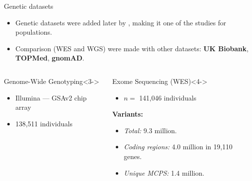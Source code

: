 \begin{frame}{Genetic datasets}

    \begin{itemize}
        \item Genetic datasets were added later by \textcite{ziyatdinov2023}, making it one of the  studies for  populations.
        \item<2-> Comparison (WES and WGS) were made with other datasets: \textbf{UK Biobank}, \textbf{TOPMed}, \textbf{gnomAD}.
    \end{itemize}

    {\footnotesize
    \begin{columns}[t]

        \begin{column}{0.3\textwidth}
            \begin{block}{Genome-Wide Genotyping}<3->
                \begin{itemize}
                    \item Illumina --- GSAv2 chip array
                    \item 138,511 individuals
                \end{itemize}
            \end{block}
        \end{column}

        \begin{column}{0.3\textwidth}
            \begin{block}{Exome Sequencing (WES)}<4->
                \begin{itemize}
                    \item $n =$ 141,046 individuals
                \end{itemize}

                \textbf{Variants:}
                \begin{itemize}
                    \item \textit{Total:} 9.3 million.
                    \item \textit{Coding regions:} 4.0 million in 19,110 genes.
                    \item \textit{Unique MCPS:} 1.4 million.
                \end{itemize}

            \end{block}        
        \end{column}


\end{columns}}
\end{frame}
